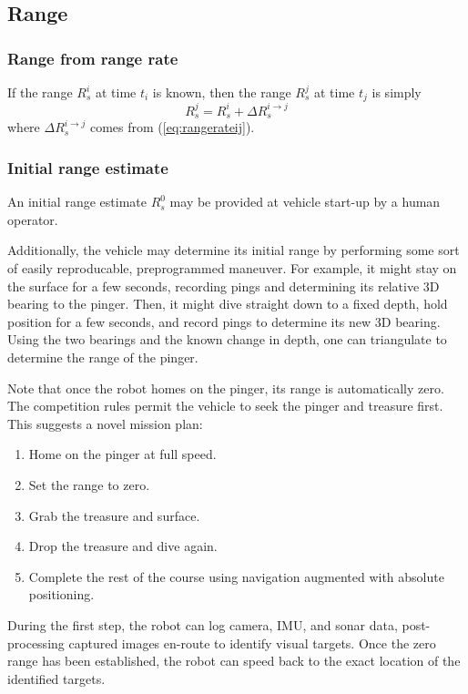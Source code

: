 \documentclass[10pt]{article}
\begin{document}
\subsection{Range}

\subsubsection{Range from range rate}

If the range \(R_s^i\) at time \(t_i\) is known, then the range \(R_s^j\) at time \(t_j\) is simply
\begin{equation}
R_s^j = R_s^i + \Delta R_s^{i\rightarrow j}
\end{equation}
where \(\Delta R_s^{i\rightarrow j}\) comes from (\ref{eq:rangerateij}).

\subsubsection{Initial range estimate}

An initial range estimate \(R_s^0\) may be provided at vehicle start-up by a human operator.

Additionally, the vehicle may determine its initial range by performing some sort of easily reproducable, preprogrammed maneuver.  For example, it might stay on the surface for a few seconds, recording pings and determining its relative 3D bearing to the pinger.  Then, it might dive straight down to a fixed depth, hold position for a few seconds, and record pings to determine its new 3D bearing.  Using the two bearings and the known change in depth, one can triangulate to determine the range of the pinger.

Note that once the robot homes on the pinger, its range is automatically zero.  The competition rules permit the vehicle to seek the pinger and treasure first.  This suggests a novel mission plan:

\begin{enumerate}
\item Home on the pinger at full speed.
\item Set the range to zero.
\item Grab the treasure and surface.
\item Drop the treasure and dive again.
\item Complete the rest of the course using navigation augmented with absolute positioning.
\end{enumerate}

During the first step, the robot can log camera, IMU, and sonar data, post-processing captured images en-route to identify visual targets.  Once the zero range has been established, the robot can speed back to the exact location of the identified targets.
\end{document}
